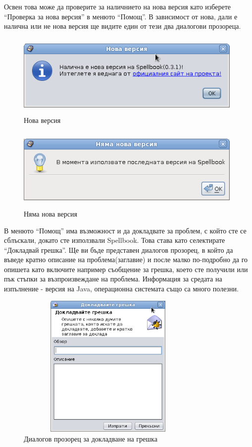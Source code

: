 Освен това може да проверите за наличнието на нова версия като
изберете "`Проверка за нова версия"' в менюто "`Помощ"'. В зависимост
от нова, дали е налична или не нова версия ще видите един от тези два
диалогови прозореца.

\begin{figure}[htbp]
  \caption{Нова версия}
  \centering
  \includegraphics[width=110mm, height=40mm]{images/new-version.png}
\end{figure}


\begin{figure}[htbp]
  \caption{Няма нова версия}
  \centering
  \includegraphics[width=110mm, height=40mm]{images/no-new-version.png}
\end{figure}

В менюто "`Помощ"' има възможност и да докладвате за проблем, с който
сте се сблъскали, докато сте използвали Spellbook. Това става като
селектирате "`Докладвай грешка"'. Ще ви бъде представен диалогов
прозорец, в който да въведе кратно описание на проблема(заглавие) и
после малко по-подробно да го опишета като включите например съобщение
за грешка, което сте получили или пък стъпки за възпроизвеждане на
проблема. Информация за средата на изпълнение - версия на Java,
операционна системата също са много полезни. 

\begin{figure}[htbp]
  \caption{Диалогов прозорец за докладване на грешка}
  \centering
  \includegraphics[width=90mm, height=70mm]{images/report-bug.png}
\end{figure}

